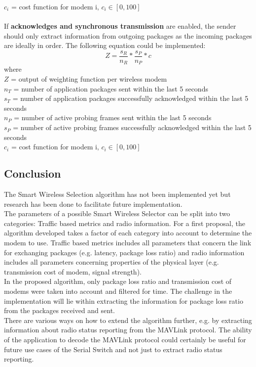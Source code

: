 $c_i$ = cost function for modem i, $c_i \in [0, 100]$\\\\
%
If \textbf{acknowledges and synchronous transmission} are enabled, the sender should only extract information from outgoing packages as the incoming packages are ideally in order. The following equation could be implemented:
\begin{equation}
Z = \frac{s_R}{n_R} * \frac{s_P}{n_P} * c 
\end{equation}
where \\
$Z$ = output of weighting function per wireless modem\\
$n_T$ = number of application packages sent within the last 5 seconds\\
$s_T$ = number of application packages successfully acknowledged within the last 5 seconds\\
$n_P$ = number of active probing frames sent within the last 5 seconds\\
$s_P$ = number of active probing frames successfully acknowledged within the last 5 seconds\\
$c_i$ = cost function for modem i, $c_i \in [0, 100]$\\
%
%
%
\subsection{Conclusion}
The Smart Wireless Selection algorithm has not been implemented yet but research has been done to facilitate future implementation.\\
The parameters of a possible Smart Wireless Selector can be split into two categories: Traffic based metrics and radio information. For a first proposal, the algorithm developed takes a factor of each category into account to determine the modem to use. Traffic based metrics includes all parameters that concern the link for exchanging packages (e.g. latency, package loss ratio) and radio information includes all parameters concerning properties of the physical layer (e.g. transmission cost of modem, signal strength).\\
In the proposed algorithm, only package loss ratio and transmission cost of modems were taken into account and filtered for time. The challenge in the implementation will lie within extracting the information for package loss ratio from the packages received and sent.\\
There are various ways on how to extend the algorithm further, e.g. by extracting information about radio status reporting from the MAVLink protocol. The ability of the application to decode the MAVLink protocol could certainly be useful for future use cases of the Serial Switch and not just to extract radio status reporting.